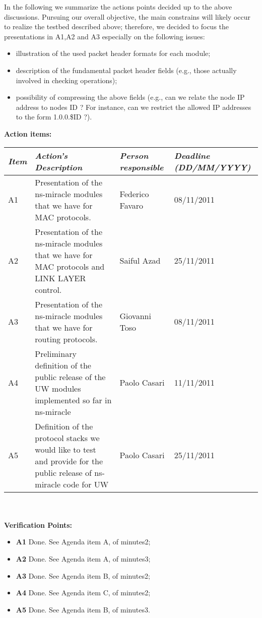 \documentclass[11pt,journal,draftclsnofoot,onecolumn,twoside,letterpaper]{IEEEtran}
\theoremstyle{definition} \newtheorem{definition}[]{Definition}
\theoremstyle{theorem} \newtheorem{theorem}[]{Theorem}
\begin{document}
In the following we summarize the actions points decided up to the above discussions. Pursuing our overall objective, the main constrains will likely occur to realize the testbed described above; therefore, we decided to focus the presentations in A1,A2 and A3 especially on the following issues:
\begin{itemize}
 \item illustration of the used packet header formats for each module;
 \item description of the fundamental packet header fields (e.g., those actually involved in checking operations);
 \item possibility of compressing the above fields (e.g., can we relate the node IP address to nodes ID ? For instance, can we restrict the allowed IP addresses to the form 1.0.0.\$ID ?).
\end{itemize}

{\bf Action items:}\\
\begin{tabular}{|p{}|p{}|p{}|p{}|}
\hline
{\it Item} & {\it Action's Description} & {\it Person responsible} & {\it Deadline (DD/MM/YYYY)}\\
\hline
A1 & Presentation of the ns-miracle modules that we have for MAC protocols. & Federico Favaro & 08/11/2011\\ 
A2 & Presentation of the ns-miracle modules that we have for MAC protocols and LINK LAYER control. & Saiful Azad & 25/11/2011\\ 
A3 & Presentation of the ns-miracle modules that we have for routing protocols. & Giovanni Toso & 08/11/2011\\
A4 & Preliminary definition of the public release of the UW modules implemented so far in ns-miracle & Paolo Casari & 11/11/2011\\
A5 & Definition of the protocol stacks we would like to test and provide for the public release of ns-miracle code for UW & Paolo Casari & 25/11/2011\\
\hline
\end{tabular}
\ \\
\ \\
{\bf Verification Points:}
\begin{itemize}
 \item {\bf A1} Done. See Agenda item A, of minutes2;
 \item {\bf A2} Done. See Agenda item A, of minutes3;
 \item {\bf A3} Done. See Agenda item B, of minutes2;
 \item {\bf A4} Done. See Agenda item C, of minutes2;
 \item {\bf A5} Done. See Agenda item B, of minutes3.
\end{itemize}
\end{document}
